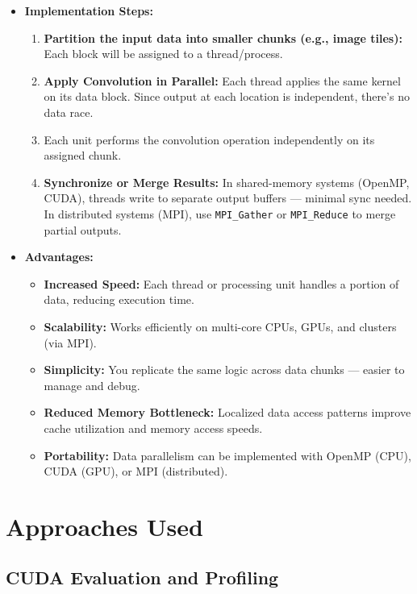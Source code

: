 \documentclass[conference, 10pt]{IEEEtran}
\begin{document}
\begin{itemize}
    \item \textbf{Implementation Steps:}
    \begin{enumerate}
        \item \textbf{Partition the input data into smaller chunks (e.g., image tiles):} Each block will be assigned to a thread/process.
        \item \textbf{Apply Convolution in Parallel:} Each thread applies the same kernel on its data block. Since output at each location is independent, there's no data race.
        \item Each unit performs the convolution operation independently on its assigned chunk.
        \item \textbf{Synchronize or Merge Results:} In shared-memory systems (OpenMP, CUDA), threads write to separate output buffers — minimal sync needed. In distributed systems (MPI), use \texttt{MPI\_Gather} or \texttt{MPI\_Reduce} to merge partial outputs.
    \end{enumerate}
    \item \textbf{Advantages:}
    \begin{itemize}
        \item \textbf{Increased Speed:} Each thread or processing unit handles a portion of data, reducing execution time.
        \item \textbf{Scalability:} Works efficiently on multi-core CPUs, GPUs, and clusters (via MPI).
        \item \textbf{Simplicity:} You replicate the same logic across data chunks — easier to manage and debug.
        \item \textbf{Reduced Memory Bottleneck:} Localized data access patterns improve cache utilization and memory access speeds.
        \item \textbf{Portability:} Data parallelism can be implemented with OpenMP (CPU), CUDA (GPU), or MPI (distributed).
    \end{itemize}
\end{itemize}





\section{Approaches Used}

\subsection{\textbf{CUDA Evaluation and Profiling}}
\end{document}
